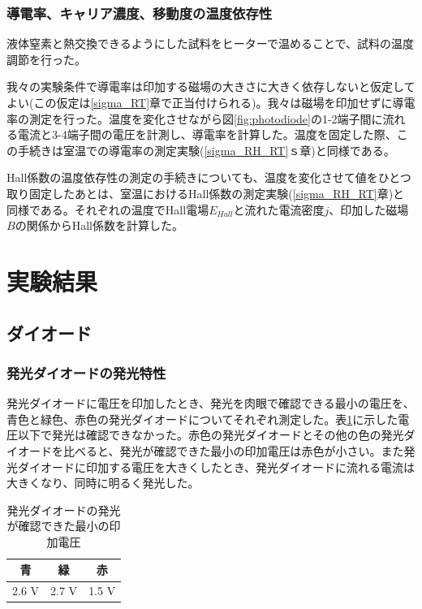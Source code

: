 \documentclass[11pt,a4]{jarticle}
\begin{document}
\subsubsection{導電率、キャリア濃度、移動度の温度依存性}
液体窒素と熱交換できるようにした試料をヒーターで温めることで、試料の温度調節を行った。

我々の実験条件で導電率は印加する磁場の大きさに大きく依存しないと仮定してよい(この仮定は\ref{sigma_RT}章で正当付けられる)。我々は磁場を印加せずに導電率の測定を行った。温度を変化させながら図\ref{fig:photodiode}の1-2端子間に流れる電流と3-4端子間の電圧を計測し、導電率を計算した。温度を固定した際、この手続きは室温での導電率の測定実験(\ref{sigma_RH_RT}ｓ章)と同様である。

Hall係数の温度依存性の測定の手続きについても、温度を変化させて値をひとつ取り固定したあとは、室温におけるHall係数の測定実験(\ref{sigma_RH_RT}章)と同様である。それぞれの温度でHall電場$E_{Hall}$と流れた電流密度$j$、印加した磁場$B$の関係からHall係数を計算した。

\section{実験結果}
\subsection{ダイオード}
\subsubsection{発光ダイオードの発光特性}
発光ダイオードに電圧を印加したとき、発光を肉眼で確認できる最小の電圧を、青色と緑色、赤色の発光ダイオードについてそれぞれ測定した。表\ref{tab:photodiode}に示した電圧以下で発光は確認できなかった。赤色の発光ダイオードとその他の色の発光ダイオードを比べると、発光が確認できた最小の印加電圧は赤色が小さい。また発光ダイオードに印加する電圧を大きくしたとき、発光ダイオードに流れる電流は大きくなり、同時に明るく発光した。

\begin{table}[!htbp]
   \begin{center}
  \begin{tabular}{ccc}
    青 & 緑 & 赤\\ \hline
    2.6 V & 2.7 V & 1.5 V\\
  \end{tabular}
  \label{tab:photodiode}
     \end{center}
       \caption{発光ダイオードの発光が確認できた最小の印加電圧}
\end{table}
\end{document}
